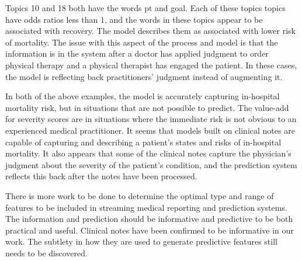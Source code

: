 \documentclass[journal]{IEEEtran}
\begin{document}
Topics 10 and 18 both have the words pt and goal.  Each of these topics topics have odds ratios less than 1, and the words in these topics appear to be associated with recovery.  The model describes them as associated with lower risk of mortality.   The issue with this aspect of the process and model is that the information is in the system after a doctor has applied judgment to order physical therapy and a physical therapist has engaged the patient.   In these cases, the model is reflecting back practitioners' judgment instead of augmenting it.  

In both of the above examples, the model is accurately capturing in-hospital mortality risk, but in situations that are not possible to predict.  The value-add for severity scores are in situations where the immediate risk is not obvious to an experienced medical practitioner.  It seems that models built on clinical notes are capable of capturing and describing a patient's states and risks of in-hospital mortality.  It also appears that some of the clinical notes capture the physician's judgment about the severity of the patient's condition, and the prediction system reflects this back after the notes have been processed.

There is more work to be done to determine the optimal type and range of features to be included in streaming medical reporting and prediction systems.   The information and prediction should be informative and predictive to be both practical and useful.  Clinical notes have been confirmed to be informative in our work.  The subtlety in how they are used to generate predictive features still needs to be discovered.    


\end{document}
